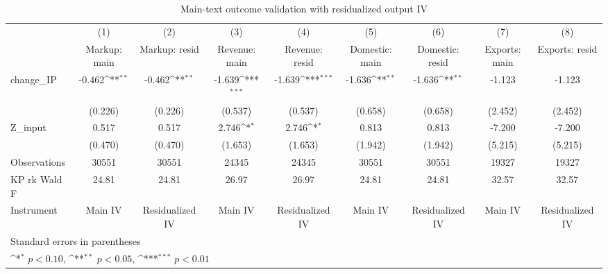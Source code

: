 \begin{table}[htbp]\centering
\def\sym#1{\ifmmode^{#1}\else\(^{#1}\)\fi}
\caption{Main-text outcome validation with residualized output IV}
\begin{tabular}{l*{8}{c}}
\hline\hline
            &\multicolumn{1}{c}{(1)}&\multicolumn{1}{c}{(2)}&\multicolumn{1}{c}{(3)}&\multicolumn{1}{c}{(4)}&\multicolumn{1}{c}{(5)}&\multicolumn{1}{c}{(6)}&\multicolumn{1}{c}{(7)}&\multicolumn{1}{c}{(8)}\\
            &\multicolumn{1}{c}{Markup: main}&\multicolumn{1}{c}{Markup: resid}&\multicolumn{1}{c}{Revenue: main}&\multicolumn{1}{c}{Revenue: resid}&\multicolumn{1}{c}{Domestic: main}&\multicolumn{1}{c}{Domestic: resid}&\multicolumn{1}{c}{Exports: main}&\multicolumn{1}{c}{Exports: resid}\\
\hline
change\_IP   &      -0.462\sym{**} &      -0.462\sym{**} &      -1.639\sym{***}&      -1.639\sym{***}&      -1.636\sym{**} &      -1.636\sym{**} &      -1.123         &      -1.123         \\
            &     (0.226)         &     (0.226)         &     (0.537)         &     (0.537)         &     (0.658)         &     (0.658)         &     (2.452)         &     (2.452)         \\
[1em]
Z\_input     &       0.517         &       0.517         &       2.746\sym{*}  &       2.746\sym{*}  &       0.813         &       0.813         &      -7.200         &      -7.200         \\
            &     (0.470)         &     (0.470)         &     (1.653)         &     (1.653)         &     (1.942)         &     (1.942)         &     (5.215)         &     (5.215)         \\
\hline
Observations&       30551         &       30551         &       24345         &       24345         &       30551         &       30551         &       19327         &       19327         \\
KP rk Wald F&       24.81         &       24.81         &       26.97         &       26.97         &       24.81         &       24.81         &       32.57         &       32.57         \\
Instrument  &     Main IV         &Residualized IV         &     Main IV         &Residualized IV         &     Main IV         &Residualized IV         &     Main IV         &Residualized IV         \\
\hline\hline
\multicolumn{9}{l}{\footnotesize Standard errors in parentheses}\\
\multicolumn{9}{l}{\footnotesize \sym{*} \(p<0.10\), \sym{**} \(p<0.05\), \sym{***} \(p<0.01\)}\\
\end{tabular}
\end{table}
